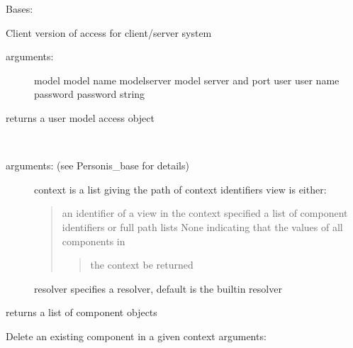 \documentclass[letterpaper,10pt,english]{sphinxmanual}
\begin{document}
\begin{fulllineitems}
\label{personis.client:personis.client.Access}
Bases: 

Client version of access for client/server system
\begin{description}
\item[{arguments:}] \leavevmode
model           model name
modelserver     model server and port
user            user name
password        password string

\end{description}

returns a user model access object

\begin{fulllineitems}
\label{personis.client:personis.client.Access.ask}~\begin{description}
\item[{arguments: (see Personis\_base for details)}] \leavevmode
context is a list giving the path of context identifiers
view is either:
\begin{quote}

an identifier of a view in the context specified
a list of component identifiers or full path lists
None indicating that the values of all components in
\begin{quote}

the context be returned
\end{quote}
\end{quote}

resolver specifies a resolver, default is the builtin resolver

\end{description}

returns a list of component objects

\end{fulllineitems}


\begin{fulllineitems}
\label{personis.client:personis.client.Access.delcomponent}
Delete an existing component in a given context
arguments:
\begin{quote}


\end{quote}
\end{fulllineitems}
\end{fulllineitems}
\end{document}
